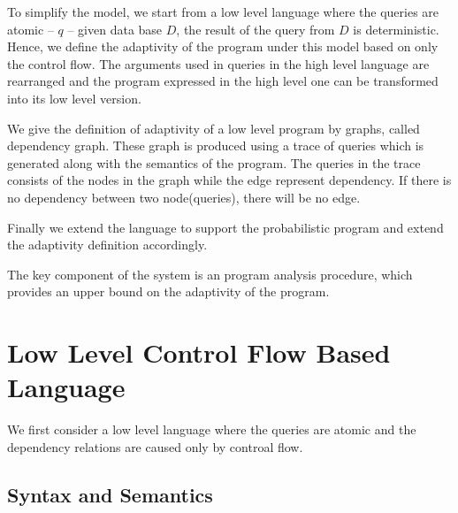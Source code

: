 \documentclass[a4paper,11pt]{article}
\begin{document}
To simplify the model, we start from a low level language where the
queries are atomic -- $q$ -- given data base $D$, the result of the
query from $D$ is deterministic. Hence, we define the adaptivity of
the program under this model based on only the control flow. The
arguments used in queries in the high level language are rearranged
and the program expressed in the high level one can be
transformed into its low level version.

We give the definition of adaptivity of a low level program by
graphs, called dependency graph. These graph is produced 
using a
trace of queries which is generated along with the semantics of the
program. The queries in the trace consists of the nodes in the graph
while the edge represent dependency. If there is no dependency between
two node(queries), there will be no edge.

Finally we extend the language to support the probabilistic program and extend the adaptivity definition accordingly.


The key component of the system is an program analysis procedure, which provides an upper bound on the adaptivity of the program.

\section{Low Level Control Flow Based Language}
We first consider a low level language where the queries are atomic
and the dependency relations are caused only by controal flow.
%
\subsection{Syntax and Semantics}
%
\end{document}

